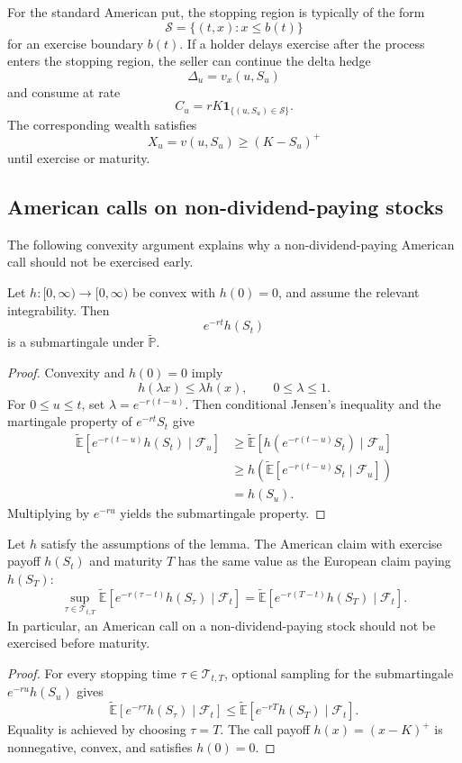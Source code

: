 For the standard American put, the stopping region is typically of the form
\[
\mathcal{S}=\{(t,x):x\leq b(t)\}
\]
for an exercise boundary $b(t)$. If a holder delays exercise after the process enters the stopping region, the seller can continue the delta hedge
\[
\Delta_u=v_x(u,S_u)
\]
and consume at rate
\[
C_u=rK\mathbf{1}_{\{(u,S_u)\in\mathcal{S}\}}.
\]
The corresponding wealth satisfies
\[
X_u=v(u,S_u)\geq(K-S_u)^+
\]
until exercise or maturity.

\subsection{American calls on non-dividend-paying stocks}

The following convexity argument explains why a non-dividend-paying American call should not be exercised early.

\begin{lem}
Let $h:[0,\infty)\to[0,\infty)$ be convex with $h(0)=0$, and assume the relevant integrability. Then
\[
e^{-rt}h(S_t)
\]
is a submartingale under $\widetilde{\mathbb{P}}$.
\end{lem}

\begin{proof}
Convexity and $h(0)=0$ imply
\[
h(\lambda x)\leq\lambda h(x),
\qquad 0\leq\lambda\leq1.
\]
For $0\leq u\leq t$, set $\lambda=e^{-r(t-u)}$. Then conditional Jensen's inequality and the martingale property of $e^{-rt}S_t$ give
\[
\begin{aligned}
\widetilde{\mathbb{E}}\!\left[
 e^{-r(t-u)}h(S_t)\mid\mathcal{F}_u
\right]
&\geq
\widetilde{\mathbb{E}}\!\left[
 h(e^{-r(t-u)}S_t)\mid\mathcal{F}_u
\right]\\
&\geq
h\!\left(
 \widetilde{\mathbb{E}}[e^{-r(t-u)}S_t\mid\mathcal{F}_u]
\right)\\
&=h(S_u).
\end{aligned}
\]
Multiplying by $e^{-ru}$ yields the submartingale property.
\end{proof}

\begin{thm}
Let $h$ satisfy the assumptions of the lemma. The American claim with exercise payoff $h(S_t)$ and maturity $T$ has the same value as the European claim paying $h(S_T)$:
\[
\sup_{\tau\in\mathcal{T}_{t,T}}
\widetilde{\mathbb{E}}\!\left[
 e^{-r(\tau-t)}h(S_\tau)\mid\mathcal{F}_t
\right]
=
\widetilde{\mathbb{E}}\!\left[
 e^{-r(T-t)}h(S_T)\mid\mathcal{F}_t
\right].
\]
In particular, an American call on a non-dividend-paying stock should not be exercised before maturity.
\end{thm}

\begin{proof}
For every stopping time $\tau\in\mathcal{T}_{t,T}$, optional sampling for the submartingale $e^{-ru}h(S_u)$ gives
\[
\widetilde{\mathbb{E}}\!\left[
 e^{-r\tau}h(S_\tau)\mid\mathcal{F}_t
\right]
\leq
\widetilde{\mathbb{E}}\!\left[
 e^{-rT}h(S_T)\mid\mathcal{F}_t
\right].
\]
Equality is achieved by choosing $\tau=T$. The call payoff $h(x)=(x-K)^+$ is nonnegative, convex, and satisfies $h(0)=0$.
\end{proof}
